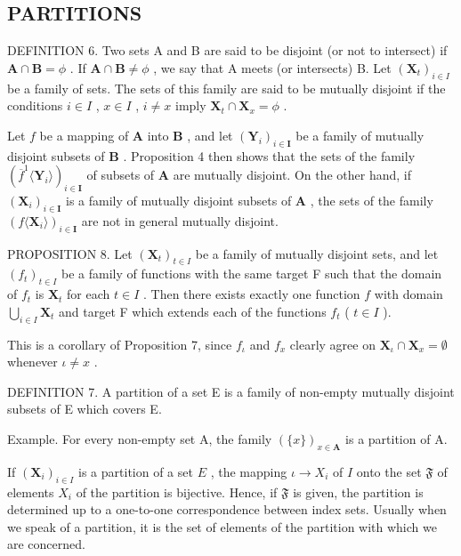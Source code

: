 \subsection{PARTITIONS}

DEFINITION 6. Two sets A and B are said to be disjoint (or not to intersect) if \(\mathbf{A} \cap \mathbf{B} = \phi\) . If \(\mathbf{A} \cap \mathbf{B} \neq \phi\) , we say that A meets (or intersects) B. Let \((\mathbf{X}_{t})_{i \in I}\) be a family of sets. The sets of this family are said to be mutually disjoint if the conditions \(i \in I\) , \(x \in I\) , \(i \neq x\) imply \(\mathbf{X}_{t} \cap \mathbf{X}_{x} = \phi\) .

Let \(f\) be a mapping of \(\mathbf{A}\) into \(\mathbf{B}\) , and let \((\mathbf{Y}_i)_{i\in \mathbf{I}}\) be a family of mutually disjoint subsets of \(\mathbf{B}\) . Proposition 4 then shows that the sets of the family \((\overline{f}^1\langle \mathbf{Y}_i\rangle)_{i\in \mathbf{I}}\) of subsets of \(\mathbf{A}\) are mutually disjoint. On the other hand, if \((\mathbf{X}_i)_{i\in \mathbf{I}}\) is a family of mutually disjoint subsets of \(\mathbf{A}\) , the sets of the family \((f\langle \mathbf{X}_i\rangle)_{i\in \mathbf{I}}\) are not in general mutually disjoint.

PROPOSITION 8. Let \((\mathbf{X}_t)_{t \in I}\) be a family of mutually disjoint sets, and let \((f_t)_{t \in I}\) be a family of functions with the same target F such that the domain of \(f_t\) is \(\mathbf{X}_t\) for each \(t \in I\) . Then there exists exactly one function \(f\) with domain \(\bigcup_{i \in I} \mathbf{X}_t\) and target F which extends each of the functions \(f_t\) ( \(t \in I\) ).

This is a corollary of Proposition 7, since \(f_{\iota}\) and \(f_{x}\) clearly agree on \(\mathbf{X}_{\iota} \cap \mathbf{X}_{x} = \emptyset\) whenever \(\iota \neq x\) .

DEFINITION 7. A partition of a set E is a family of non-empty mutually disjoint subsets of E which covers E.

Example. For every non-empty set A, the family \((\{x\})_{x\in\mathbf{A}}\) is a partition of A.

If \((\mathbf{X}_i)_{i\in I}\) is a partition of a set \(E\) , the mapping \(\iota \to X_i\) of \(I\) onto the set \(\mathfrak{F}\) of elements \(X_i\) of the partition is bijective. Hence, if \(\mathfrak{F}\) is given, the partition is determined up to a one-to-one correspondence between index sets. Usually when we speak of a partition, it is the set of elements of the partition with which we are concerned.

